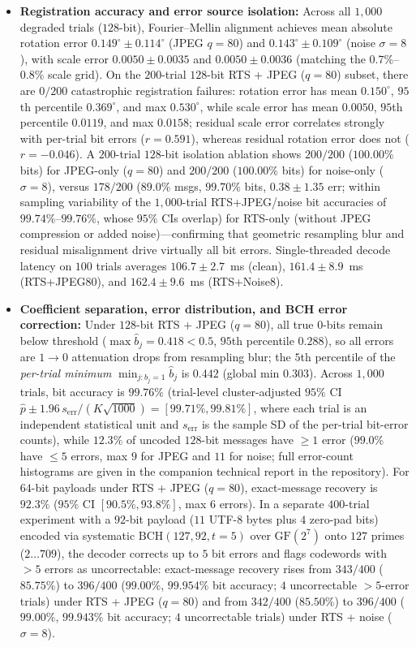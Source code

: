 \documentclass[]{interact}
\theoremstyle{plain}
\theoremstyle{definition}
\theoremstyle{remark}
\begin{document}
\begin{itemize}
  \item \textbf{Registration accuracy and error source isolation:} Across all $1{,}000$ degraded trials ($128$-bit), Fourier--Mellin alignment achieves mean absolute rotation error $0.149^\circ \pm 0.114^\circ$ (JPEG $q=80$) and $0.143^\circ \pm 0.109^\circ$ (noise $\sigma=8$), with scale error $0.0050 \pm 0.0035$ and $0.0050 \pm 0.0036$ (matching the $0.7\%$--$0.8\%$ scale grid). On the $200$-trial $128$-bit RTS + JPEG ($q=80$) subset, there are $0/200$ catastrophic registration failures: rotation error has mean $0.150^\circ$, $95$th percentile $0.369^\circ$, and max $0.530^\circ$, while scale error has mean $0.0050$, $95$th percentile $0.0119$, and max $0.0158$; residual scale error correlates strongly with per-trial bit errors ($r = 0.591$), whereas residual rotation error does not ($r = -0.046$). A $200$-trial $128$-bit isolation ablation shows $200/200$ ($100.00\%$ bits) for JPEG-only ($q=80$) and $200/200$ ($100.00\%$ bits) for noise-only ($\sigma=8$), versus $178/200$ ($89.0\%$ msgs, $99.70\%$ bits, $0.38 \pm 1.35$ err; within sampling variability of the $1{,}000$-trial RTS+JPEG/noise bit accuracies of $99.74\%$--$99.76\%$, whose $95\%$ CIs overlap) for RTS-only (without JPEG compression or added noise)—confirming that geometric resampling blur and residual misalignment drive virtually all bit errors. Single-threaded decode latency on $100$ trials averages $106.7 \pm 2.7$~ms (clean), $161.4 \pm 8.9$~ms (RTS+JPEG80), and $162.4 \pm 9.6$~ms (RTS+Noise8).
  \item \textbf{Coefficient separation, error distribution, and BCH error correction:} Under $128$-bit RTS + JPEG ($q=80$), all true $0$-bits remain below threshold ($\max \hat{b}_j = 0.418 < 0.5$, $95$th percentile $0.288$), so all errors are $1 \to 0$ attenuation drops from resampling blur; the $5$th percentile of the \emph{per-trial minimum} $\min_{j: b_j=1} \hat{b}_j$ is $0.442$ (global min $0.303$). Across $1{,}000$ trials, bit accuracy is $99.76\%$ (trial-level cluster-adjusted $95\%$ CI $\hat{p} \pm 1.96\,s_{\mathrm{err}}/(K\sqrt{1000}) = [99.71\%, 99.81\%]$, where each trial is an independent statistical unit and $s_{\mathrm{err}}$ is the sample SD of the per-trial bit-error counts), while $12.3\%$ of uncoded $128$-bit messages have $\ge 1$ error ($99.0\%$ have $\le 5$ errors, max $9$ for JPEG and $11$ for noise; full error-count histograms are given in the companion technical report in the repository). For $64$-bit payloads under RTS + JPEG ($q=80$), exact-message recovery is $92.3\%$ ($95\%$ CI $[90.5\%, 93.8\%]$, max $6$ errors). In a separate $400$-trial experiment with a $92$-bit payload ($11$ UTF-8 bytes plus $4$ zero-pad bits) encoded via systematic $\mathrm{BCH}(127, 92, t=5)$ over $\mathrm{GF}(2^7)$ onto $127$ primes ($2 \dots 709$), the decoder corrects up to $5$ bit errors and flags codewords with $>5$ errors as uncorrectable: exact-message recovery rises from $343/400$ ($85.75\%$) to $396/400$ ($99.00\%$, $99.954\%$ bit accuracy; $4$ uncorrectable $>5$-error trials) under RTS + JPEG ($q=80$) and from $342/400$ ($85.50\%$) to $396/400$ ($99.00\%$, $99.943\%$ bit accuracy; $4$ uncorrectable trials) under RTS + noise ($\sigma=8$).
\end{itemize}
\end{document}
